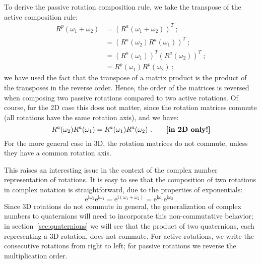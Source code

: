 To derive the passive rotation composition rule, we take the transpose of the active composition rule:
\begin{align*}
	R^p(\omega_1+\omega_2) &= \left(R^a(\omega_1+\omega_2)\right)^T\ ;\\ 
	&= \left(R^a(\omega_2)R^a(\omega_1)\right)^T\ ;\\
	&= \left(R^a(\omega_1)\right)^T\left(R^a(\omega_2)\right)^T\ ;\\
	&= R^p(\omega_1)R^p(\omega_2)\ ;
\end{align*}
we have used the fact that the transpose of a matrix product is the product of the transposes in the reverse order.  Hence, the order of the matrices is reversed when composing two passive rotations compared to two active rotations.  Of course, for the 2D case this does not matter, since the rotation matrices commute (all rotations have the same rotation axis), and we have:
\[
	R^a(\omega_2)R^a(\omega_1) = R^a(\omega_1)R^a(\omega_2)\ .\qquad\text{\textbf{[in 2D only!]}}
\]
For the more general case in 3D, the rotation matrices do not commute, unless they have a common rotation axis. 

This raises an interesting issue in the context of the complex number representation of rotations.  It is easy to see that the composition of two rotations in complex notation is straightforward, due to the properties of exponentials:
\[
	\mathrm{e}^{\mathrm{i}\omega_2}\mathrm{e}^{\mathrm{i}\omega_1}
	=\mathrm{e}^{\mathrm{i}(\omega_1+\omega_2)} = 
	\mathrm{e}^{\mathrm{i}\omega_1}\mathrm{e}^{\mathrm{i}\omega_2}\ .
\]	
Since 3D rotations do not commute in general, the generalization of complex numbers to quaternions will need to incorporate this non-commutative behavior; in section~\ref{sec:quaternions} we will see that the product of two quaternions, each representing a 3D rotation, does not commute.  For active rotations, we write the consecutive rotations from right to left; for passive rotations we reverse the multiplication order.






